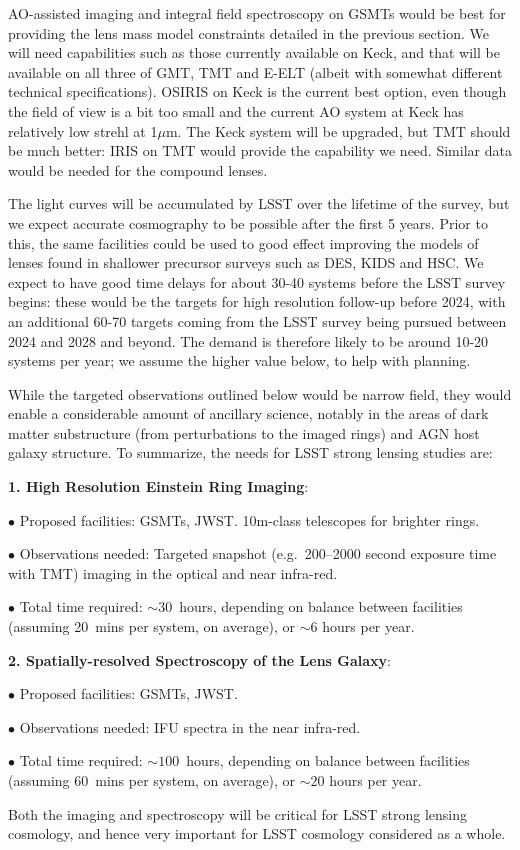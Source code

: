 AO-assisted imaging and integral field spectroscopy on GSMTs would be
best for providing the lens mass model constraints detailed in the
previous section.  We will need capabilities such as those currently
available on Keck, and that will be available on all three of GMT, TMT
and E-ELT (albeit with somewhat different technical specifications).
OSIRIS on Keck is the current best option, even though the field of view
is a bit too small and the current AO system at Keck has relatively low
strehl at 1$\mu$m. The Keck system will be upgraded, but TMT should be
much better: IRIS on TMT would provide the capability we need. Similar
data would be needed for the compound lenses.

The light curves will be accumulated by LSST over the lifetime of the
survey, but we expect accurate cosmography to be possible after the
first 5 years.  Prior to this, the same facilities could be used to good
effect improving the models of lenses found in shallower precursor
surveys such as DES, KIDS and HSC. We expect to have good time delays
for about 30-40 systems before the LSST survey begins: these would be
the targets for high resolution follow-up before 2024, with an
additional 60-70 targets coming from the LSST survey being pursued
between 2024 and 2028 and beyond. The demand is therefore likely to be
around 10-20 systems per year; we assume the higher value below, to help
with planning.

While the targeted observations outlined below would be narrow field,
they would enable a considerable amount of ancillary science, notably in
the areas of dark matter substructure (from perturbations to the imaged
rings) and AGN host galaxy structure.  To summarize, the needs for LSST strong lensing studies are:

{\bf 1. High Resolution Einstein Ring Imaging}:

$\bullet$ Proposed facilities: GSMTs, JWST. 10m-class telescopes for
brighter rings.

$\bullet$ Observations needed: Targeted snapshot (e.g.\ 200--2000
second exposure time with TMT) imaging in the optical and near infra-red.

$\bullet$ Total time required: $\sim30$~hours, depending
on balance between facilities (assuming 20~mins per system, on average),
or $\sim 6$ hours per year.

{\bf 2. Spatially-resolved Spectroscopy of the Lens Galaxy}:

$\bullet$ Proposed facilities: GSMTs, JWST.

$\bullet$ Observations needed: IFU spectra in the near infra-red.

$\bullet$ Total time required: $\sim100$~hours, depending
on balance between facilities (assuming 60~mins per system, on average),
or $\sim 20$ hours per year.

Both the imaging and spectroscopy will be critical for LSST strong lensing cosmology, and hence very important for LSST cosmology considered as a whole.
